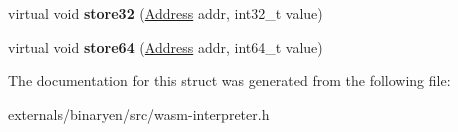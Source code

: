 \begin{DoxyCompactItemize}
virtual void {\bfseries store32} (\mbox{\hyperlink{structwasm_1_1_address}{Address}} addr, int32\+\_\+t value)
\item 
\mbox{\label{structwasm_1_1_module_instance_base_1_1_external_interface_a220b9d17691974491cf992140cc07415}} 
virtual void {\bfseries store64} (\mbox{\hyperlink{structwasm_1_1_address}{Address}} addr, int64\+\_\+t value)
\end{DoxyCompactItemize}


The documentation for this struct was generated from the following file\+:\begin{DoxyCompactItemize}
\item 
externals/binaryen/src/wasm-\/interpreter.\+h\end{DoxyCompactItemize}
